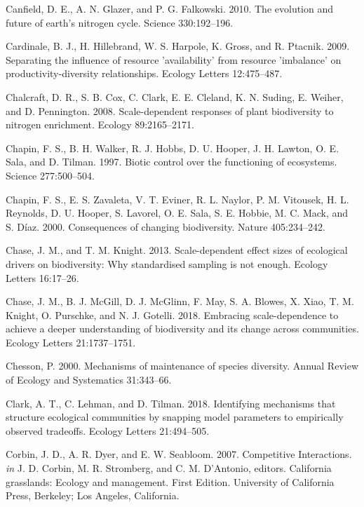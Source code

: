 \documentclass[twoside,12pt,final]{ucthesis-CA2012}
\newlength{\cslhangindent}
\newenvironment{cslreferences}%
  {\setlength{\parindent}{0pt}%
  \everypar{\setlength{\hangindent}{\cslhangindent}}\ignorespaces}%
  {\par}
\begin{document}
\begin{ucmainmatter}
\begin{cslreferences}
\leavevmode\hypertarget{ref-canfield2010}{}%
Canfield, D. E., A. N. Glazer, and P. G. Falkowski. 2010. The evolution and future of earth's nitrogen cycle. Science 330:192--196.

\leavevmode\hypertarget{ref-Cardinale2009}{}%
Cardinale, B. J., H. Hillebrand, W. S. Harpole, K. Gross, and R. Ptacnik. 2009. Separating the influence of resource 'availability' from resource 'imbalance' on productivity-diversity relationships. Ecology Letters 12:475--487.

\leavevmode\hypertarget{ref-chalcraft2008}{}%
Chalcraft, D. R., S. B. Cox, C. Clark, E. E. Cleland, K. N. Suding, E. Weiher, and D. Pennington. 2008. Scale-dependent responses of plant biodiversity to nitrogen enrichment. Ecology 89:2165--2171.

\leavevmode\hypertarget{ref-Chapin1997}{}%
Chapin, F. S., B. H. Walker, R. J. Hobbs, D. U. Hooper, J. H. Lawton, O. E. Sala, and D. Tilman. 1997. Biotic control over the functioning of ecosystems. Science 277:500--504.

\leavevmode\hypertarget{ref-Chapin2000}{}%
Chapin, F. S., E. S. Zavaleta, V. T. Eviner, R. L. Naylor, P. M. Vitousek, H. L. Reynolds, D. U. Hooper, S. Lavorel, O. E. Sala, S. E. Hobbie, M. C. Mack, and S. Díaz. 2000. Consequences of changing biodiversity. Nature 405:234--242.

\leavevmode\hypertarget{ref-chase2013}{}%
Chase, J. M., and T. M. Knight. 2013. Scale-dependent effect sizes of ecological drivers on biodiversity: Why standardised sampling is not enough. Ecology Letters 16:17--26.

\leavevmode\hypertarget{ref-chase2018}{}%
Chase, J. M., B. J. McGill, D. J. McGlinn, F. May, S. A. Blowes, X. Xiao, T. M. Knight, O. Purschke, and N. J. Gotelli. 2018. Embracing scale-dependence to achieve a deeper understanding of biodiversity and its change across communities. Ecology Letters 21:1737--1751.

\leavevmode\hypertarget{ref-Chesson2000}{}%
Chesson, P. 2000. Mechanisms of maintenance of species diversity. Annual Review of Ecology and Systematics 31:343--66.

\leavevmode\hypertarget{ref-Clark2018}{}%
Clark, A. T., C. Lehman, and D. Tilman. 2018. Identifying mechanisms that structure ecological communities by snapping model parameters to empirically observed tradeoffs. Ecology Letters 21:494--505.

\leavevmode\hypertarget{ref-Corbin2007}{}%
Corbin, J. D., A. R. Dyer, and E. W. Seabloom. 2007. Competitive Interactions. \emph{in} J. D. Corbin, M. R. Stromberg, and C. M. D'Antonio, editors. California grasslands: Ecology and management. First Edition. University of California Press, Berkeley; Los Angeles, California.


\end{cslreferences}
\end{ucmainmatter}
\end{document}
